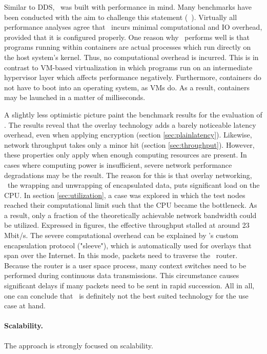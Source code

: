 Similar to DDS, \docker\ was built with performance in mind. Many benchmarks have been conducted with the aim to challenge this statement (\eg\ \cite{felter2015updated,morabito2015hypervisors}). Virtually all performance analyses agree that \docker\ incurs minimal computational and IO overhead, provided that it is configured properly. One reason why \docker\ performs well is that programs running within containers are actual processes which run directly on the host system's kernel. Thus, no computational overhead is incurred. This is in contrast to VM-based virtualization in which programs run on an intermediate hypervisor layer which affects performance negatively. Furthermore, containers do not have to boot into an operating system, as VMs do. As a result, containers may be launched in a matter of milliseconds.

A slightly less optimistic picture paint the benchmark results for the evaluation of \wnet . The results reveal that the overlay technology adds a barely noticeable latency overhead, even when applying encryption (\cf section \ref{sec:plainlatency}). Likewise, network throughput takes only a minor hit (\cf section \ref{sec:throughput}). However, these properties only apply when enough computing resources are present. In cases where computing power is insufficient, severe network performance degradations may be the result. The reason for this is that overlay networking, \ie\ the wrapping and unwrapping of encapsulated data, puts significant load on the CPU. In section \ref{sec:utilization}, a case was explored in which the test nodes reached their computational limit such that the CPU became the bottleneck. As a result, only a fraction of the theoretically achievable network bandwidth could be utilized. Expressed in figures, the effective throughput stalled at around 23 Mbit/s. The severe computational overhead can be explained by \weave 's custom encapsulation protocol ("sleeve"), which is automatically used for overlays that span over the Internet. In this mode, packets need to traverse the \weave\ router. Because the router is a user space process, many context switches need to be performed during continuous data transmissions. This circumstance causes significant delays if many packets need to be sent in rapid succession. All in all, one can conclude that \wnet\ is definitely not the best suited technology for the use case at hand.


\paragraph{Scalability.}
The approach is strongly focused on scalability. 

